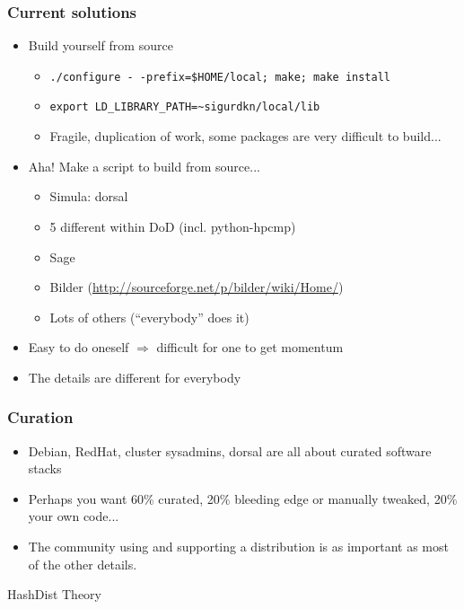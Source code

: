 \documentclass[sans,mathserif]{beamer}
\begin{document}
\begin{frame}
  \frametitle{Current solutions}
  \begin{itemize}
  \item<+-> Build yourself from source
    \begin{itemize}
    \item<+-> {\tt ./configure -\,{}-prefix=\$HOME/local; make; make install}
    \item<+-> {\tt export LD\_LIBRARY\_PATH=\textasciitilde{}sigurdkn/local/lib}
    \item<+-> Fragile, duplication of work, some packages are very difficult to
        build...
    \end{itemize}
  \item<+-> Aha! Make a script to build from source...
    \begin{itemize}
    \item Simula: dorsal
    \item 5 different within DoD (incl. python-hpcmp)
    \item Sage
    \item Bilder (\url{http://sourceforge.net/p/bilder/wiki/Home/})
    \item Lots of others (``everybody'' does it)
    \end{itemize}
  \item<+-> Easy to do oneself $\Rightarrow$ difficult for one to get
    momentum
  \item<+-> The details are different for everybody
  \end{itemize}

\end{frame}


\begin{frame}
  \frametitle{Curation}
  
  \begin{itemize}
  \item<+-> Debian, RedHat, cluster sysadmins, dorsal are all about curated software stacks
  \item<+-> Perhaps you want 60\% curated, 20\% bleeding edge or manually tweaked, 20\% your own code...
  \item<+-> The community using and supporting a distribution is as important as most of the other details. 
  \end{itemize}
\end{frame}

\begin{frame}
  \begin{center}
    {\Large HashDist Theory}
  \end{center}
\end{frame}
\end{document}
